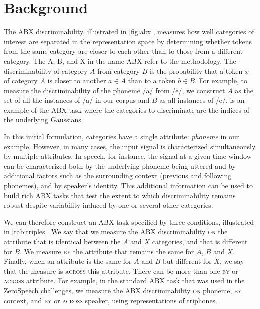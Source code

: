 \documentclass[11pt]{article}
\newcommand{\on}{\textsc{on}\xspace}
\newcommand{\by}{\textsc{by}\xspace}
\newcommand{\across}{\textsc{across}\xspace}
\begin{document}
\section{Background}

The ABX discriminability, illustrated in \cref{fig:abx}, measures how well categories of interest are separated in the representation space by determining whether tokens from the same category are closer to each other than to those from a different category. The A, B, and X in the name ABX refer to the methodology. The discriminability of category $A$ from category $B$ is the probability that a token $x$ of category $A$ is closer to another $a \in A$ than to a token $b \in B$.  For example, to measure the discriminability of the phoneme /a/ from /e/, we construct $A$ as the set of all the instances of /a/ in our corpus and $B$ as all instances of /e/.  is an example of the ABX task where the categories to discriminate are the indices of the underlying Gaussians.

In this initial formulation, categories have a single attribute: \textit{phoneme} in our example. However, in many cases, the input signal is characterized simultaneously by multiple attributes. In speech, for instance, the signal at a given time window can be characterized both by the underlying phoneme being uttered and by additional factors such as the surrounding context (previous and following phonemes), and by speaker's identity. This additional information can be used to build rich ABX tasks that test the extent to which discriminability remains robust despite variability induced by one or several other categories.

\begin{table}
    \centering
    \setlength{\tabcolsep}{4.5pt}
    
    \caption{Example of valid triples for various ABX tasks. Only the attributes specified in the \on, \by and \across conditions are used to build valid triples.}
    \label{tab:triples}
\end{table}

We can therefore construct an ABX task specified by three conditions, illustrated in \cref{tab:triples}. We say that we measure the ABX discriminability \on the attribute that is identical between the $A$ and $X$ categories, and that is different for $B$. We measure \by the attribute that remains the same for $A$, $B$ and $X$. Finally, when an attribute is the same for $A$ and $B$ but different for $X$, we say that the measure is \across this attribute. There can be more than one \by or \across attribute. For example, in the standard ABX task that was used in the ZeroSpeech challenges, we measure the ABX discriminability \on phoneme, \by context, and \by or \across speaker, using representations of triphones.
\end{document}
